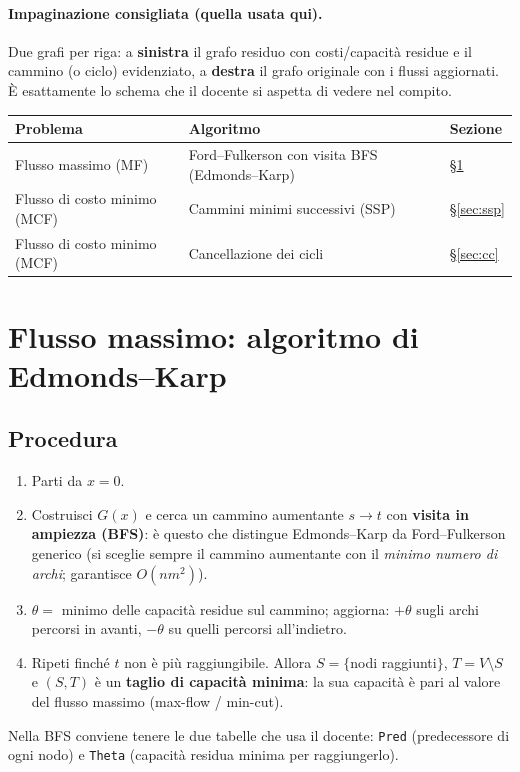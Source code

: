 \documentclass[11pt,a4paper]{article}
\begin{document}
\paragraph{Impaginazione consigliata (quella usata qui).} Due grafi per riga:
a \textbf{sinistra} il grafo residuo con costi/capacità residue e il cammino (o ciclo) evidenziato,
a \textbf{destra} il grafo originale con i flussi aggiornati. È esattamente lo schema che il
docente si aspetta di vedere nel compito.

\vspace{2mm}
\begin{center}
\begin{tabular}{@{}lll@{}}
\toprule
Problema & Algoritmo & Sezione\\
\midrule
Flusso massimo (MF) & Ford--Fulkerson con visita BFS (Edmonds--Karp) & \S\ref{sec:ek}\\
Flusso di costo minimo (MCF) & Cammini minimi successivi (SSP) & \S\ref{sec:ssp}\\
Flusso di costo minimo (MCF) & Cancellazione dei cicli & \S\ref{sec:cc}\\
\bottomrule
\end{tabular}
\end{center}

\newpage

\section{Flusso massimo: algoritmo di Edmonds--Karp}\label{sec:ek}

\subsection{Procedura}
\begin{enumerate}[nosep]
  \item Parti da $x=0$.
  \item Costruisci $G(x)$ e cerca un cammino aumentante $s\to t$ con \textbf{visita in ampiezza (BFS)}:
        è questo che distingue Edmonds--Karp da Ford--Fulkerson generico (si sceglie sempre
        il cammino aumentante con il \emph{minimo numero di archi}; garantisce $O(nm^2)$).
  \item $\theta=$ minimo delle capacità residue sul cammino; aggiorna: $+\theta$ sugli archi
        percorsi in avanti, $-\theta$ su quelli percorsi all'indietro.
  \item Ripeti finché $t$ non è più raggiungibile. Allora $S=\{$nodi raggiunti$\}$,
        $T=V\setminus S$ e $(S,T)$ è un \textbf{taglio di capacità minima}: la sua capacità
        è pari al valore del flusso massimo (max-flow / min-cut).
\end{enumerate}
Nella BFS conviene tenere le due tabelle che usa il docente: \texttt{Pred} (predecessore di
ogni nodo) e \texttt{Theta} (capacità residua minima per raggiungerlo).
\end{document}
